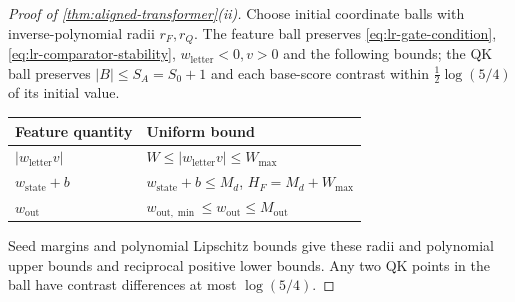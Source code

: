 \begin{proof}[Proof of \cref{thm:aligned-transformer}(ii)]
Choose initial coordinate balls with inverse-polynomial radii $r_F,r_Q$.
The feature ball preserves \eqref{eq:lr-gate-condition},
\eqref{eq:lr-comparator-stability}, $w_{\mathrm{letter}}<0,v>0$ and the
following bounds; the QK ball preserves $|B|\le S_A=S_0+1$ and each
base-score contrast within $\frac12\log(5/4)$ of its initial value.
\begin{center}
\small
\begin{tabular}{@{}ll@{}}
\toprule
Feature quantity & Uniform bound \\
\midrule
$|w_{\mathrm{letter}}v|$ & $W\le|w_{\mathrm{letter}}v|\le W_{\max}$ \\
$w_{\mathrm{state}}+b$ & $w_{\mathrm{state}}+b\le M_d$, $H_F=M_d+W_{\max}$ \\
$w_{\mathrm{out}}$ & $w_{\mathrm{out},\min}\le w_{\mathrm{out}}\le M_{\mathrm{out}}$ \\
\bottomrule
\end{tabular}
\end{center}
Seed margins and polynomial Lipschitz bounds give these radii and polynomial
upper bounds and reciprocal positive lower bounds. Any two QK points
in the ball have contrast differences at most $\log(5/4)$.


\end{proof}
